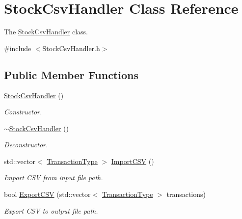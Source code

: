 \hypertarget{class_stock_csv_handler}{}\section{Stock\+Csv\+Handler Class Reference}
\label{class_stock_csv_handler}


The \mbox{\hyperlink{class_stock_csv_handler}{Stock\+Csv\+Handler}} class.  




{\ttfamily \#include $<$Stock\+Csv\+Handler.\+h$>$}

\subsection*{Public Member Functions}
\begin{DoxyCompactItemize}
\item 
\mbox{\hyperlink{class_stock_csv_handler_a79a39d762f4dd87f82ee927c33f596cc}{Stock\+Csv\+Handler}} ()
\begin{DoxyCompactList}\small\item\em Constructor. \end{DoxyCompactList}\item 
\mbox{\hyperlink{class_stock_csv_handler_a9c197759533cc003c511d784a1cdb521}{$\sim$\+Stock\+Csv\+Handler}} ()
\begin{DoxyCompactList}\small\item\em Deconstructor. \end{DoxyCompactList}\item 
std\+::vector$<$ \mbox{\hyperlink{class_transaction_type}{Transaction\+Type}} $>$ \mbox{\hyperlink{class_stock_csv_handler_a3b32398ef8bf2994162802496d721333}{Import\+C\+SV}} ()
\begin{DoxyCompactList}\small\item\em Import C\+SV from input file path. \end{DoxyCompactList}\item 
bool \mbox{\hyperlink{class_stock_csv_handler_a5302fb4580cc69a73aa22a6e97e314ad}{Export\+C\+SV}} (std\+::vector$<$ \mbox{\hyperlink{class_transaction_type}{Transaction\+Type}} $>$ transactions)
\begin{DoxyCompactList}\small\item\em Export C\+SV to output file path. \end{DoxyCompactList}\item 
\mbox{\label{class_stock_csv_handler_af0fa483a54671ac9cf6d14fb7991f3d3}} 

\end{DoxyCompactItemize}
